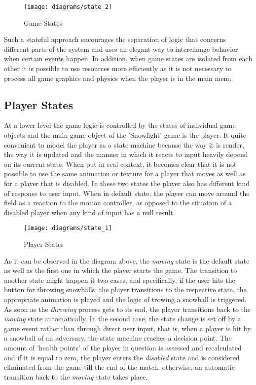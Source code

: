 \begin{figure}[!h]
\centering
\texttt{[image: diagrams/state\_2]}
\caption{Game States}\label{diag:state_2}
\end{figure}

Such a stateful approach encourages the separation of logic that concerns
different parts of the system and uses an elegant way to interchange behavior
when certain events happen. In addition, when game states are isolated from each
other it is possible to use resources more efficiently as it is not necessary to
process all game graphics and physics when the player is in the main menu.

\newpage

\subsection{Player States}

At a lower level the game logic is controlled by the states of individual game
objects and the main game object of the 'Snowfight' game is the player. It quite
convenient to model the player as a state machine because the way it is render,
the way it is updated and the manner in which it reacts to input heavily depend
on its current state. When put in real context, it becomes clear that it is not
possible to use the same animation or texture for a player that moves as well as
for a player that is disabled. In these two states the player also has different
kind of response to user input. When in default state, the player can move
around the field as a reaction to the motion controller, as opposed to the
situation of a disabled player when any kind of input has a null result.

\begin{figure}[!h]
\centering
\texttt{[image: diagrams/state\_1]}
\caption{Player States}\label{diag:state_1}
\end{figure}

As it can be observed in the diagram above, the \emph{moving} state is the
default state as well as the first one in which the player starts the game. The
transition to another state might happen it two cases, and specifically, if the
user hits the button for throwing snowballs, the player transitions to the
respective state, the appropriate animation is played and the logic of trowing a
snowball is triggered. As soon as the \emph{throwing} process gets to its end,
the player transitions back to the \emph{moving} state automatically. In the
second case, the state change is set off by a game event rather than through
direct user input, that is, when a player is hit by a snowball of an adversary,
the state machine reaches a decision point. The amount of 'health points' of the
player in question is assessed and recalculated and if it is equal to zero, the
player enters the \emph{disabled} state and is considered eliminated from the
game till the end of the match, otherwise, an automatic transition back to the
\emph{moving} state takes place.

